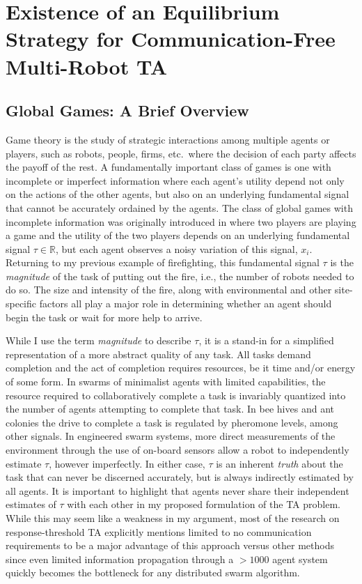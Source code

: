 \documentclass[defaultstyle,12pt]{proposal}
\begin{document}
\chapter{Existence of an Equilibrium Strategy for Communication-Free Multi-Robot TA}\label{ch:existeqrtm}
\section{Global Games: A Brief Overview}\label{sec:ggoverview}
Game theory is the study of strategic interactions among multiple agents or players, such as robots, people, firms, etc.\ where the decision of each party affects the payoff of the rest. A fundamentally important class of games is one with incomplete or imperfect information where each agent's utility depend not only on the actions of the other agents, but also on an underlying fundamental signal that cannot be accurately ordained by the agents. The class of global games with incomplete information was originally introduced in \cite{Carlsson1993} where two players are playing a game and the utility of the two players depends on an underlying fundamental signal $\tau \in \mathbb{R}$, but each agent observes a noisy variation of this signal, $x_i$. Returning to my previous example of firefighting, this fundamental signal $\tau$ is the \emph{magnitude} of the task of putting out the fire, i.e., the number of robots needed to do so. The size and intensity of the fire, along with environmental and other site-specific factors all play a major role in determining whether an agent should begin the task or wait for more help to arrive.

While I use the term \emph{magnitude} to describe $\tau$, it is a stand-in for a simplified representation of a more abstract quality of any task. All tasks demand completion and the act of completion requires resources, be it time and/or energy of some form. In swarms of minimalist agents with limited capabilities, the resource required to collaboratively complete a task is invariably quantized into the number of agents attempting to complete that task.
In bee hives and ant colonies the drive to complete a task is regulated by pheromone levels, among other signals.  In engineered swarm systems, more direct measurements of the environment through the use of on-board sensors allow a robot to independently estimate $\tau$, however imperfectly. In either case, $\tau$ is an inherent \emph{truth} about the task that can never be discerned accurately, but is always indirectly estimated by all agents. It is important to highlight that agents never share their independent estimates of $\tau$ with each other in my proposed formulation of the TA problem. While this may seem like a weakness in my argument, most of the research on response-threshold TA explicitly mentions limited to no communication requirements to be a major advantage of this approach versus other methods since even limited information propagation through a $>1000$ agent system quickly becomes the bottleneck for any distributed swarm algorithm.
\end{document}
